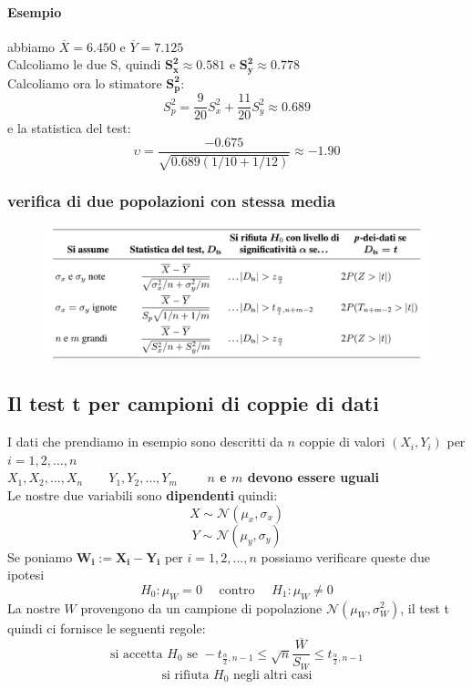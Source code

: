 \documentclass[]{article}
\begin{document}
    \paragraph{Esempio} abbiamo $\overline{X} = 6.450$ e $\overline{Y} = 7.125$ \\
    Calcoliamo le due S, quindi $\boldsymbol{S^2_x \approx 0.581}$ e $\boldsymbol{S^2_y \approx 0.778}$ \\
    Calcoliamo ora lo stimatore $\boldsymbol{S^2_p}$:
    \[ S^2_p = \frac{9}{20} S^2_x + \frac{11}{20} S^2_y \approx 0.689 \]
    e la statistica del test:
    \[ \upsilon = \frac{-0.675}{\sqrt{0.689 ( 1/10 + 1/12)}} \approx -1.90 \]
    \subsubsection{verifica di due popolazioni con stessa media}
    \begin{figure}[H]
        \includegraphics[width=\textwidth]{images/boh_10.png}
    \end{figure}
    \subsection{Il test t per campioni di coppie di dati}
    I dati che prendiamo in esempio sono descritti da $n$ coppie di valori $(X_i, Y_i)$ per $i = 1,2,\ldots, n$ \\
    $X_1, X_2, \ldots, X_n \qquad Y_1, Y_2, \ldots, Y_m \qquad$ \textbf{$n$ e $m$ devono essere uguali} \\ 
    Le nostre due variabili sono \textbf{dipendenti} quindi:
    \[ X \sim \mathcal{N}(\mu_x, \sigma_x) \]
    \[ Y \sim \mathcal{N}(\mu_y, \sigma_y) \]
    Se poniamo $\boldsymbol{W_i := X_i - Y_i}$ per $i=1,2,\ldots,n$ possiamo verificare queste due ipotesi
    \[ H_0 : \mu_W = 0 \quad \text{ contro } \quad H_1 : \mu_W \not = 0 \]
    La nostre $W$ provengono da un campione di popolazione $\mathcal{N}(\mu_W, \sigma^2_W)$, il test t quindi ci fornisce le seguenti regole:
    \[ \text{si accetta } H_0 \text{ se } - t_{\frac{\alpha}{2}, n-1} \leq \sqrt{n} \frac{\overline{W}}{S_W} \leq t_{\frac{\alpha}{2}, n-1} \]
    \[ \text{si rifiuta } H_0 \text{ negli altri casi} \]
\end{document}
